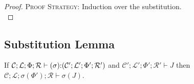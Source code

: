 \documentclass[11pt]{article}%
\newcommand{\ctxC}{\mathcal{C}}%
\newcommand{\ctxL}{\mathcal{L}}%
\newcommand{\ctxN}{\Phi}%
\newcommand{\ctxR}{\mathcal{R}}%
\newcommand{\CLNRp}{\ctxC' ; \ctxL' ; \ctxN' ; \ctxR'}
\begin{document}
\begin{proof}
    \textsc{Proof Strategy:} Induction over the substitution.\\


\end{proof}

\subsection{Substitution Lemma}\label{subsec:sub_lemma}

If $\mathcal{C}  ;  \mathcal{L}  ;  \Phi  ;  \mathcal{R}  \vdash  (  \sigma  )  {:}  (  \mathcal{C}'  ;  \mathcal{L}'  ;  \Phi'  ;  \mathcal{R}'  )$ and $\CLNRp \vdash
J$ then $\ctxC ; \ctxL ; \sigma ( \ctxN' ) ; \ctxR \vdash \sigma ( J )$. 
\end{document}
